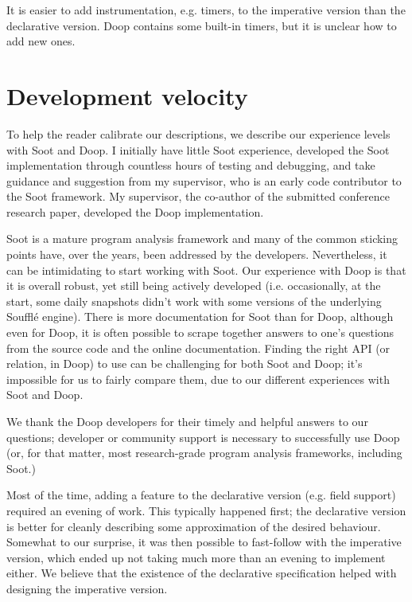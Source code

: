 It is easier to add instrumentation, e.g. timers, to the imperative version than the declarative version. Doop contains some built-in timers, but it is unclear how to add new ones.

\section{Development velocity}

To help the reader calibrate our descriptions, we describe our experience levels with Soot and Doop. I initially have little Soot experience, developed the Soot implementation through countless hours of testing and debugging, and take guidance and suggestion from my supervisor, who is an early code contributor to the Soot framework. My supervisor, the co-author of the submitted conference research paper, developed the Doop implementation.

Soot is a mature program analysis framework and many of the common sticking points have, over the years, been addressed by the developers. Nevertheless, it can be intimidating to start working with Soot. Our experience with Doop is that it is overall robust, yet still being actively developed (i.e. occasionally, at the start, some daily snapshots didn't work with some versions of the underlying Soufflé engine). There is more documentation for Soot than for Doop, although even for Doop, it is often possible to scrape together answers to one's questions from the source code and the online documentation. Finding the right API (or relation, in Doop) to use can be challenging for both Soot and Doop; it's impossible for us to fairly compare them, due to our different experiences with Soot and Doop.

We thank the Doop developers for their timely and helpful answers to our questions; developer or community support is necessary to successfully use Doop (or, for that matter, most research-grade program analysis frameworks, including Soot.)

Most of the time, adding a feature to the declarative version (e.g. field support) required an evening of work. This typically happened first; the declarative version is better for cleanly describing some approximation of the desired behaviour. Somewhat to our surprise, it was then possible to fast-follow with the imperative version, which ended up not taking much more than an evening to implement either. We believe that the existence of the declarative specification helped with designing the imperative version.

